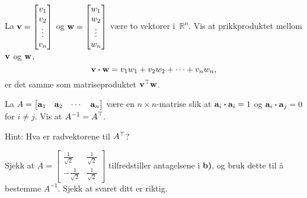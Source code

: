 \begin{oppgave}


\begin{punkt}
La $\mathbf{v}=\begin{bmatrix}
v_1\\
v_2\\
\vdots\\
v_n
\end{bmatrix}$ og $\mathbf{w}=\begin{bmatrix}
w_1\\
w_2\\
\vdots\\
w_n
\end{bmatrix}$ være to vektorer i~$\mathbb{R}^n$. Vis at prikkproduktet mellom $\mathbf{v}$ og $\mathbf{w}$, $$\mathbf{v}\boldsymbol{\cdot} \mathbf{w}=v_1w_1+v_2w_2+\cdots+v_nw_n,$$ er det samme som matriseproduktet $\mathbf{v}^\top\mathbf{w}$.
\end{punkt}

\begin{punkt}
La $A=\begin{bmatrix}
\mathbf{a}_1 & \mathbf{a}_2 & \cdots & \mathbf{a}_n
\end{bmatrix}
$ være en $n\times n$-matrise slik at $\mathbf{a}_i \boldsymbol{\cdot} \mathbf{a}_i=1$ og $\mathbf{a}_i\boldsymbol{\cdot} \mathbf{a}_j=0$ for $i\neq j$. Vis at $A^{-1}=A^\top$.

Hint: Hva er radvektorene til $A^\top$?
\end{punkt}

\begin{punkt}
Sjekk at $A=\begin{bmatrix}
\frac{1}{\sqrt{2}} & \frac{1}{\sqrt{2}}\\
-\frac{1}{\sqrt{2}} & \frac{1}{\sqrt{2}}
\end{bmatrix}$
tilfredstiller antagelsene i \textbf{b)}, og bruk dette til å bestemme $A^{-1}$. Sjekk at svaret ditt er riktig.
\end{punkt}

\end{oppgave}


